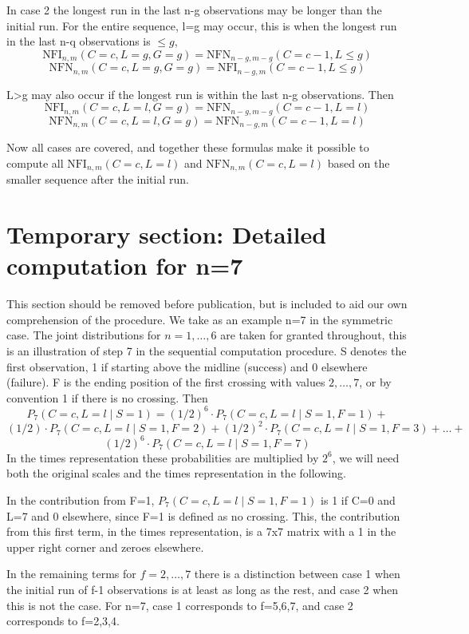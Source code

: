 In case 2 the longest run in the last n-g observations may be longer than the initial run. For the entire sequence, l=g may occur, this is when the longest run in the last n-q observations is $\leq g$,
$$\text{NFI}_{n,m} (C=c, L=g, G=g) = \text{NFN}_{n-g,m-g} (C=c-1, L \leq g)$$
$$\text{NFN}_{n,m} (C=c, L=g, G=g) = \text{NFI}_{n-g,m} (C=c-1, L \leq g)$$

L>g may also occur if the longest run is within the last n-g observations. Then
$$\text{NFI}_{n,m} (C=c, L=l, G=g) = \text{NFN}_{n-g,m-g} (C=c-1, L=l)$$
$$\text{NFN}_{n,m} (C=c, L=l, G=g) = \text{NFN}_{n-g,m} (C=c-1, L=l)$$

Now all cases are covered, and together these formulas make it possible to compute all $\text{NFI}_{n,m} (C=c, L=l)$ and $\text{NFN}_{n,m} (C=c, L=l)$ based on the smaller sequence after the initial run.

\section{Temporary section: Detailed computation for n=7}

This section should be removed before publication, but is included to aid our own comprehension of the procedure. We take as an example n=7 in the symmetric case. The joint distributions for $n=1, \ldots, 6$ are taken for granted throughout, this is an illustration of step 7 in the sequential computation procedure. S denotes the first observation, 1 if starting above the midline (success) and 0 elsewhere (failure). F is the ending position of the first crossing with values $2, \ldots, 7$, or by convention 1 if there is no crossing. Then $$P_7 (C=c, L=l \mid S=1) = (1/2)^6 \cdot   P_7 (C=c, L=l \mid S=1,F=1) +    $$  $$(1/2) \cdot P_7 (C=c, L=l \mid S=1,F=2) + (1/2)^2 \cdot P_7 (C=c, L=l \mid S=1,F=3) + \ldots  +$$ $$(1/2)^6 \cdot P_7 (C=c, L=l \mid S=1,F=7) $$
In the times representation these probabilities are multiplied by $2^6$, we will need both the original scales and the times representation in the following. 

In the contribution from F=1, $P_7 (C=c, L=l \mid S=1,F=1)$ is 1 if C=0 and L=7 and 0 elsewhere, since F=1 is defined as no crossing. This, the contribution from this first term, in the times representation, is a 7x7 matrix with a 1 in the upper right corner and zeroes elsewhere. 

In the remaining terms for $f=2, \ldots, 7$ there is a distinction between case 1 when the initial run of f-1 observations is at least as long as the rest, and case 2 when this is not the case. For n=7, case 1 corresponds to f=5,6,7, and case 2 corresponds to f=2,3,4. 

